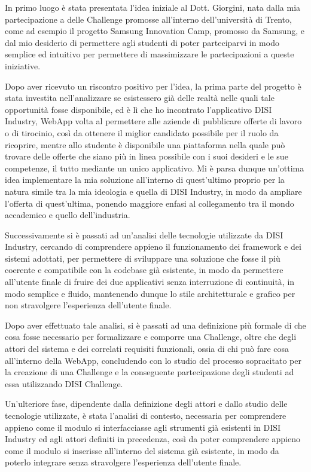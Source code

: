 In primo luogo è stata presentata l'idea iniziale al Dott. Giorgini, nata dalla mia partecipazione a delle Challenge promosse all'interno dell'università di Trento, come ad esempio il progetto Samsung Innovation Camp, promosso da Samsung, e dal mio desiderio di permettere agli studenti di poter parteciparvi in modo semplice ed intuitivo per permettere di massimizzare le partecipazioni a queste iniziative.

Dopo aver ricevuto un riscontro positivo per l'idea, la prima parte del progetto è stata investita nell'analizzare se esistessero già delle realtà nelle quali tale opportunità fosse disponibile, ed è lì che ho incontrato l'applicativo DISI Industry, WebApp volta al permettere alle aziende di pubblicare offerte di lavoro o di tirocinio, così da ottenere il miglior candidato possibile per il ruolo da ricoprire, mentre allo studente è disponibile una piattaforma nella quale può trovare delle offerte che siano più in linea possibile con i suoi desideri e le sue competenze, il tutto mediante un unico applicativo. Mi è parsa dunque un'ottima idea implementare la mia soluzione all'interno di quest'ultimo proprio per la natura simile tra la mia ideologia e quella di DISI Industry, in modo da ampliare l'offerta di quest'ultima, ponendo maggiore enfasi al collegamento tra il mondo accademico e quello dell'industria.

Successivamente si è passati ad un'analisi delle tecnologie utilizzate da DISI Industry, cercando di comprendere appieno il funzionamento dei framework e dei sistemi adottati, per permettere di sviluppare una soluzione che fosse il più coerente e compatibile con la codebase già esistente, in modo da permettere all'utente finale di fruire dei due applicativi senza interruzione di continuità, in modo semplice e fluido, mantenendo dunque lo stile architetturale e grafico per non stravolgere l'esperienza dell'utente finale.


Dopo aver effettuato tale analisi, si è passati ad una definizione più formale di che cosa fosse necessario per formalizzare e comporre una Challenge, oltre che degli attori del sistema e dei correlati requisiti funzionali, ossia di chi può fare cosa all'interno della WebApp, concludendo con lo studio del processo sopracitato per la creazione di una Challenge e la conseguente partecipazione degli studenti ad essa utilizzando DISI Challenge.

Un'ulteriore fase, dipendente dalla definizione degli attori e dallo studio delle tecnologie utilizzate, è stata l'analisi di contesto, necessaria per comprendere appieno come il modulo si interfacciasse agli strumenti già esistenti in DISI Industry ed agli attori definiti in precedenza, così da poter comprendere appieno come il modulo si inserisse all'interno del sistema già esistente, in modo da poterlo integrare senza stravolgere l'esperienza dell'utente finale.

